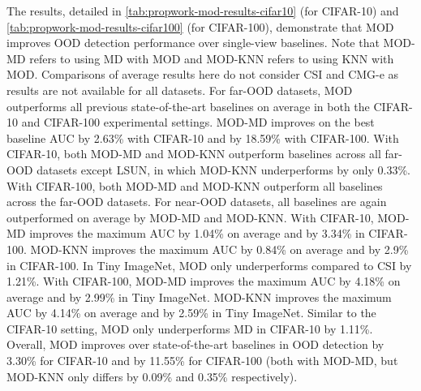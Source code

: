 The results, detailed in \ref{tab:propwork-mod-results-cifar10} (for CIFAR-10) and \ref{tab:propwork-mod-results-cifar100} (for CIFAR-100), demonstrate that MOD improves OOD detection performance over single-view baselines. Note that MOD-MD refers to using MD with MOD and MOD-KNN refers to using KNN with MOD. Comparisons of average results here do not consider CSI and CMG-e as results are not available for all datasets. For far-OOD datasets, MOD outperforms all previous state-of-the-art baselines on average in both the CIFAR-10 and CIFAR-100 experimental settings. MOD-MD improves on the best baseline AUC by 2.63\% with CIFAR-10 and by 18.59\% with CIFAR-100. With CIFAR-10, both MOD-MD and MOD-KNN outperform baselines across all far-OOD datasets except LSUN, in which MOD-KNN underperforms by only 0.33\%. With CIFAR-100, both MOD-MD and MOD-KNN outperform all baselines across the far-OOD datasets. For near-OOD datasets, all baselines are again outperformed on average by MOD-MD and MOD-KNN. With CIFAR-10, MOD-MD improves the maximum AUC by 1.04\% on average and by 3.34\% in CIFAR-100. MOD-KNN improves the maximum AUC by 0.84\% on average and by 2.9\% in CIFAR-100. In Tiny ImageNet, MOD only underperforms compared to CSI by 1.21\%. With CIFAR-100, MOD-MD improves the maximum AUC by 4.18\% on average and by 2.99\% in Tiny ImageNet. MOD-KNN improves the maximum AUC by 4.14\% on average and by 2.59\% in Tiny ImageNet. Similar to the CIFAR-10 setting, MOD only underperforms MD in CIFAR-10 by 1.11\%. Overall, MOD improves over state-of-the-art baselines in OOD detection by 3.30\% for CIFAR-10 and by 11.55\% for CIFAR-100 (both with MOD-MD, but MOD-KNN only differs by 0.09\% and 0.35\% respectively).
\vspace{3cm}

